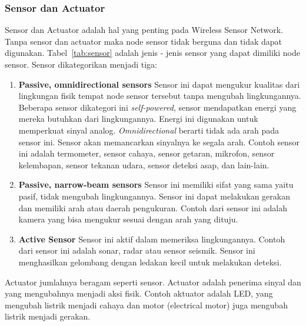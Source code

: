 \subsubsection{Sensor dan Actuator}
Sensor dan Actuator adalah hal yang penting pada Wireless Sensor Network. Tanpa sensor dan actuator maka node sensor tidak berguna dan tidak dapat digunakan. Tabel~\ref{tab:sensor} adalah jenis - jenis sensor yang dapat dimiliki node sensor. Sensor dikategorikan menjadi tiga:
\begin{enumerate}
	\item \textbf{Passive, omnidirectional sensors} Sensor ini dapat mengukur kualitas dari lingkungan fisik tempat node sensor tersebut tanpa mengubah lingkungannya. Beberapa sensor dikategori ini \textit{self-powered}, sensor mendapatkan energi yang mereka butuhkan dari lingkungannya. Energi ini digunakan untuk memperkuat sinyal analog. \textit{Omnidirectional} berarti tidak ada arah pada sensor ini. Sensor akan memancarkan sinyalnya ke segala arah. Contoh sensor ini adalah termometer, sensor cahaya, sensor getaran, mikrofon, sensor kelembapan, sensor tekanan udara, sensor deteksi asap, dan lain-lain.
	\item \textbf{Passive, narrow-beam sensors} Sensor ini memiliki sifat yang sama yaitu pasif, tidak mengubah lingkungannya. Sensor ini dapat melakukan gerakan dan memiliki arah atau daerah pengukuran. Contoh dari sensor ini adalah kamera yang bisa mengukur sesuai dengan arah yang dituju.
	\item \textbf{Active Sensor} Sensor ini aktif dalam memeriksa lingkungannya. Contoh dari sensor ini adalah sonar, radar atau sensor seismik. Sensor ini menghasilkan gelombang dengan ledakan kecil untuk melakukan deteksi.
\end{enumerate}

Actuator jumlahnya beragam seperti sensor. Actuator adalah penerima sinyal dan yang mengubahnya menjadi aksi fisik. Contoh aktuator adalah LED, yang mengubah listrik menjadi cahaya dan motor (electrical motor) juga mengubah listrik menjadi gerakan.

